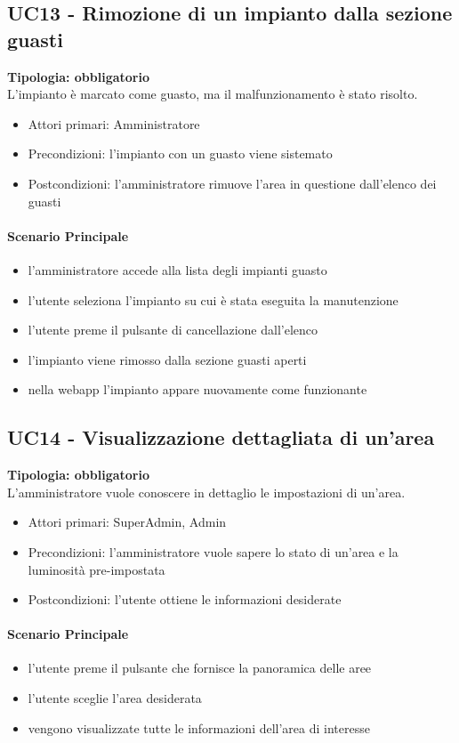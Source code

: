 \documentclass[12pt]{article}
\begin{document}
\subsection{UC13 - Rimozione di un impianto dalla sezione guasti}
\textbf{Tipologia: obbligatorio} \\
L'impianto è marcato come guasto, ma il malfunzionamento è stato risolto.
\begin{itemize}
	\item Attori primari: Amministratore
	\item Precondizioni: l'impianto con un guasto viene sistemato
	\item Postcondizioni: l'amministratore rimuove l'area in questione dall'elenco dei guasti
\end{itemize}
\paragraph{Scenario Principale}
\begin{itemize}
	\item l'amministratore accede alla lista degli impianti guasto
	\item l'utente seleziona l'impianto su cui è stata eseguita la manutenzione
	\item l'utente preme il pulsante di cancellazione dall'elenco
	\item l'impianto viene rimosso dalla sezione guasti aperti
	\item nella webapp l'impianto appare nuovamente come funzionante
\end{itemize}


\subsection{UC14 - Visualizzazione dettagliata di un'area}
\textbf{Tipologia: obbligatorio} \\
L'amministratore vuole conoscere in dettaglio le impostazioni di un'area.
\begin{itemize}
	\item Attori primari: SuperAdmin, Admin
	\item Precondizioni: l'amministratore vuole sapere lo stato di un'area e la luminosità pre-impostata
	\item Postcondizioni: l'utente ottiene le informazioni desiderate
\end{itemize}
\paragraph{Scenario Principale}
\begin{itemize}
	\item l'utente preme il pulsante che fornisce la panoramica delle aree
	\item l'utente sceglie l'area desiderata
	\item vengono visualizzate tutte le informazioni dell'area di interesse
\end{itemize}
\end{document}
